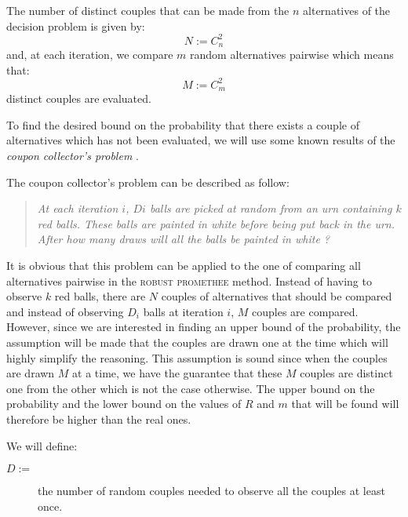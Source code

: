 The number of distinct couples that can be made from the $n$ alternatives of the decision problem is given by:
\begin{equation}
    \label{def:couples}
    N:= C_n^2
\end{equation}
and, at each iteration, we compare $m$ random alternatives pairwise which means that:
\begin{equation}
    \label{def:iterationcouples}
    M:= C_m^2
\end{equation}
distinct couples are evaluated.

To find the desired bound on the probability that there exists a couple of alternatives which has not been evaluated, we will use some known results of the \textit{coupon collector's problem} \cite{Mitzenmacher:2005:PCR:1076315}.

The coupon collector's problem can be described as follow:

\begin{quote}
\textit{
At each iteration $i$, $Di$ balls are picked at random from an urn containing $k$ red balls. These balls are painted in white before being put back in the urn. After how many draws will all the balls be painted in white ?\\}
\end{quote}


It is obvious that this problem can be applied to the one of comparing all alternatives pairwise in the \textsc{robust promethee} method. Instead of having to observe $k$ red balls, there are $N$ couples of alternatives that should be compared and instead of observing $D_i$ balls at iteration $i$, $M$ couples are compared.
However, since we are interested in finding an upper bound of the probability, the assumption will be made that the couples are drawn one at the time which will highly simplify the reasoning.
This assumption is sound since when the couples are drawn $M$ at a time, we have the guarantee that these $M$ couples are distinct one from the other which is not the case otherwise. The upper bound on the probability and the lower bound on the values of $R$ and $m$ that will be found will therefore be higher than the real ones.

We will define:
\begin{description}
\item[$D:=$] the number of random couples needed to observe all the couples at least once.
\end{description}


